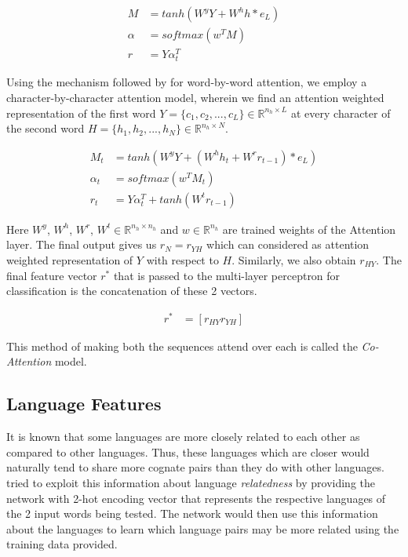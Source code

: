 \documentclass[11pt,letterpaper]{article}
\begin{document}
\begin{align}
M &= tanh(W^yY + W^hh*e_L) \\
\alpha &= softmax(w^TM) \\
r &= Y\alpha_t^T
\end{align}

Using the mechanism followed by \cite{rocktaschel2016reasoning} for word-by-word attention, we employ a character-by-character attention model, wherein we find an attention weighted representation of the first word $Y = \{c_1, c_2, ..., c_L\} \in \mathbb{R}^{n_h \times L}$ at every character of the second word $H = \{h_1, h_2, ..., h_N\} \in \mathbb{R}^{n_h \times N}$.

\begin{align}
M_t &= tanh(W^yY + (W^hh_t + W^rr_{t-1})*e_L) \\
\alpha_t &= softmax(w^TM_t) \\
r_t &= Y\alpha_t^T + tanh(W^tr_{t-1})
\end{align}

Here $W^y$, $W^h$, $W^r$, $W^t \in  \mathbb{R}^{n_h \times n_h}$ and $w \in \mathbb{R}^{n_h}$ are trained weights of the Attention layer. The final output gives us $r_N = r_{YH}$ which can considered as attention weighted representation of $Y$ with respect to $H$. Similarly, we also obtain $r_{HY}$. The final feature vector $r^*$ that is passed to the multi-layer perceptron for classification is the concatenation of these 2 vectors.

\begin{align}
r^* &= [r_{HY} r_{YH}]
\end{align}

 This method of making both the sequences attend over each is called the \textit{Co-Attention} model.
 
\subsection{Language Features}

It is known that some languages are more closely related to each other as compared to other languages. Thus, these languages which are closer would naturally tend to share more cognate pairs than they do with other languages. \cite{rama2016siamese} tried to exploit this information about language \textit{relatedness} by providing the network with 2-hot encoding vector that represents the respective languages of the 2 input words being tested. The network would then use this information about the languages to learn which language pairs may be more related using the training data provided.
\end{document}
